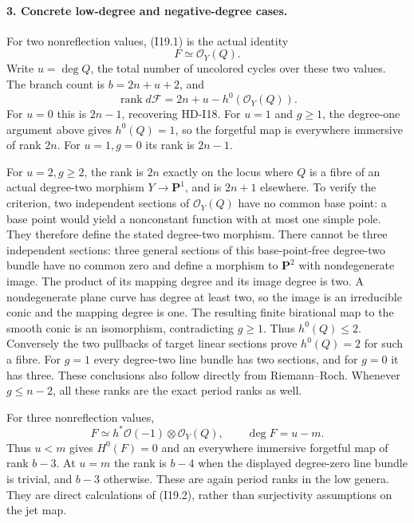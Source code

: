 \paragraph{3. Concrete low-degree and negative-degree cases.}
For two nonreflection values, (I19.1) is the actual identity
\[
                       F\simeq\mathcal O_Y(Q).
\]
Write $u=\deg Q$, the total number of uncolored cycles over
these two values. The branch count is $b=2n+u+2$, and
\begin{equation}
       \operatorname{rank}d\mathcal F
                       =2n+u-h^0(\mathcal O_Y(Q)).     \tag{I19.4}
\end{equation}
For $u=0$ this is $2n-1$, recovering HD-I18. For $u=1$ and
$g\geq1$, the degree-one argument above gives $h^0(Q)=1$,
so the forgetful map is everywhere immersive of rank $2n$.
For $u=1,g=0$ its rank is $2n-1$.

For $u=2,g\geq2$, the rank is $2n$ exactly on the locus
where $Q$ is a fibre of an actual degree-two morphism
$Y\to\mathbf P^1$, and is $2n+1$ elsewhere. To verify the
criterion, two independent sections of $\mathcal O_Y(Q)$
have no common base point: a base point would yield a
nonconstant function with at most one simple pole. They
therefore define the stated degree-two morphism. There cannot
be three independent sections: three general sections of this
base-point-free degree-two bundle have no common zero and define
a morphism to $\mathbf P^2$ with nondegenerate image. The
product of its mapping degree and its image degree is two.
A nondegenerate plane curve has degree at least two, so the
image is an irreducible conic and the mapping degree is one.
The resulting finite birational map to the smooth conic is an
isomorphism, contradicting $g\geq1$. Thus $h^0(Q)\leq2$.
Conversely the two pullbacks of target linear sections prove
$h^0(Q)=2$ for such a fibre.
For $g=1$ every degree-two line bundle has two sections, and
for $g=0$ it has three. These conclusions also follow directly
from Riemann--Roch. Whenever $g\leq n-2$, all these ranks
are the exact period ranks as well.

For three nonreflection values,
\[
               F\simeq h^*\mathcal O(-1)\otimes\mathcal O_Y(Q),
               \qquad \deg F=u-m.
\]
Thus $u<m$ gives $H^0(F)=0$ and an everywhere immersive
forgetful map of rank $b-3$. At $u=m$ the rank is $b-4$
when the displayed degree-zero line bundle is trivial, and
$b-3$ otherwise. These are again period ranks in the low
genera. They are direct calculations of (I19.2), rather than
surjectivity assumptions on the jet map.

